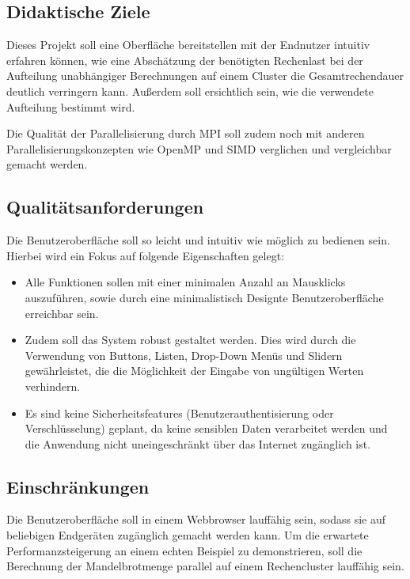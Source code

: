 \subsection{Didaktische Ziele}

Dieses Projekt soll eine Oberfläche bereitstellen mit der Endnutzer intuitiv erfahren können, wie
eine Abschätzung der benötigten Rechenlast bei der Aufteilung unabhängiger
Berechnungen auf einem Cluster die Gesamtrechendauer deutlich verringern kann.
Außerdem soll ersichtlich sein, wie die verwendete Aufteilung bestimmt wird.

Die Qualität der Parallelisierung durch MPI soll zudem noch mit anderen Parallelisierungskonzepten
wie OpenMP und SIMD verglichen und vergleichbar gemacht werden.

\subsection{Qualitätsanforderungen}

Die Benutzeroberfläche soll so leicht und intuitiv wie möglich zu bedienen sein.
Hierbei wird ein Fokus auf folgende Eigenschaften gelegt:
\begin{itemize}
	\item Alle Funktionen sollen mit einer minimalen
	      Anzahl an Mausklicks auszuführen, sowie durch eine
	      minimalistisch Designte Benutzeroberfläche erreichbar sein.
	\item Zudem soll das System robust gestaltet werden.
	      Dies wird durch die Verwendung von Buttons, Listen, Drop-Down Menüs und Slidern gewährleistet,
          die die Möglichkeit der Eingabe von ungültigen Werten verhindern.
	\item Es sind keine Sicherheitsfeatures (Benutzerauthentisierung oder Verschlüsselung) geplant,
	      da keine sensiblen Daten verarbeitet werden und die Anwendung nicht uneingeschränkt über das Internet zugänglich ist.
\end{itemize}



\subsection{Einschränkungen}

Die Benutzeroberfläche soll in einem Webbrowser lauffähig sein, sodass sie auf beliebigen Endgeräten
zugänglich gemacht werden kann.
Um die erwartete Performanzsteigerung an einem echten Beispiel zu demonstrieren,
soll die Berechnung der Mandelbrotmenge parallel auf einem Rechencluster lauffähig sein.

